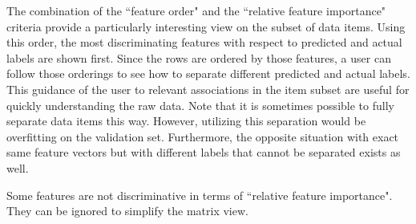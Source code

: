 
The combination of the ``feature order" and the ``relative feature importance" criteria provide a particularly interesting view on the subset of data items.
Using this order, the most discriminating features with respect to predicted and actual labels are shown first.
Since the rows are ordered by those features, a user can follow those orderings to see how to separate different predicted and actual labels.
This guidance of the user to relevant associations in the item subset are useful for quickly understanding the raw data.
Note that it is sometimes possible to fully separate data items this way.
However, utilizing this separation would be overfitting on the validation set.
Furthermore, the opposite situation with exact same feature vectors but with different labels that cannot be separated exists as well.

Some features are not discriminative in terms of ``relative feature importance". They can be ignored to simplify the matrix view.
